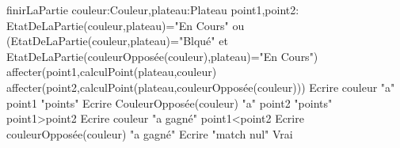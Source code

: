 \begin{algorithme}
	\small
	\fonction
	{finirLaPartie}
	{couleur:Couleur,plateau:Plateau}
	{\booleen}
	{point1,point2:\naturel}
	\sialorssinon 
		{EtatDeLaPartie(couleur,plateau)="En Cours" ou (EtatDeLaPartie(couleur,plateau)="Blqué" et EtatDeLaPartie(couleurOpposée(couleur),plateau)="En Cours")}
		{}	
		{affecter(point1,calculPoint(plateau,couleur)
		affecter(point2,calculPoint(plateau,couleurOpposée(couleur)))
		Ecrire couleur "a" point1 "points"
		Ecrire CouleurOpposée(couleur) "a" point2 "points"
		\sialorssinon
			{point1>point2}
			{Ecrire couleur "a gagné"}
			{\sialorssinon
				{point1<point2}
				{Ecrire couleurOpposée(couleur) "a gagné"}
				{Ecrire "match nul"}
		    }
		    \retourner Vrai
		}
\end{algorithme}